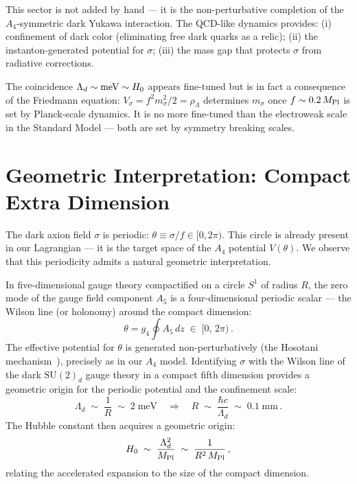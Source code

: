 This sector is not added by hand — it is the non-perturbative completion of
the $A_4$-symmetric dark Yukawa interaction. The QCD-like dynamics provides:
(i) confinement of dark color (eliminating free dark quarks as a relic);
(ii) the instanton-generated potential for $\sigma$;
(iii) the mass gap that protects $\sigma$ from radiative corrections.

The coincidence $\Lambda_d \sim {\rm meV} \sim H_0$ appears fine-tuned but is
in fact a consequence of the Friedmann equation: $V_\sigma = f^2 m_\sigma^2/2 = \rho_\Lambda$
determines $m_\sigma$ once $f \sim 0.2\,M_{\rm Pl}$ is set by Planck-scale dynamics.
It is no more fine-tuned than the electroweak scale in the Standard Model — both
are set by symmetry breaking scales.


\section{Geometric Interpretation: Compact Extra Dimension}
\label{disc:extradim}

The dark axion field $\sigma$ is periodic: $\theta \equiv \sigma/f \in [0,2\pi)$.
This circle is already present in our Lagrangian — it is the target space
of the $A_4$ potential $V(\theta)$. We observe that this periodicity admits
a natural geometric interpretation.

In five-dimensional gauge theory compactified on a circle $S^1$ of radius $R$,
the zero mode of the gauge field component $A_5$ is a four-dimensional
periodic scalar — the Wilson line (or holonomy) around the compact dimension:
\begin{equation}
  \theta = g_4 \oint A_5 \, dz \;\in\; [0,\,2\pi)\,.
\end{equation}
The effective potential for $\theta$ is generated non-perturbatively
(the Hosotani mechanism~\cite{Hosotani1983}), precisely as in our $A_4$ model.
Identifying $\sigma$ with the Wilson line of the dark $\mathrm{SU}(2)_d$
gauge theory in a compact fifth dimension provides a geometric origin
for the periodic potential and the confinement scale:
\begin{equation}
  \Lambda_d \;\sim\; \frac{1}{R} \;\sim\; 2\;\text{meV}
  \quad\Longrightarrow\quad
  R \;\sim\; \frac{\hbar c}{\Lambda_d}
  \;\sim\; 0.1\;\text{mm}\,.
  \label{eq:R_extradim}
\end{equation}
The Hubble constant then acquires a geometric origin:
\begin{equation}
  H_0 \;\sim\; \frac{\Lambda_d^2}{M_{\rm Pl}}
  \;\sim\; \frac{1}{R^2\,M_{\rm Pl}}\,,
  \label{eq:H0_geometric}
\end{equation}
relating the accelerated expansion to the size of the compact dimension.

